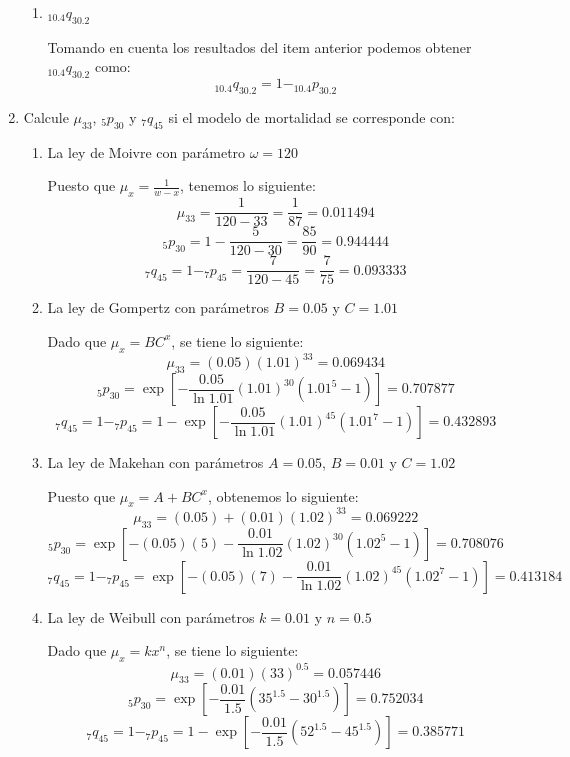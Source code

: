 \documentclass[12pt,a4paper,oneside]{article}\usepackage[]{graphicx}\usepackage[]{color}
\begin{document}
\begin{enumerate}
\begin{enumerate}
      \item $_{10.4}q_{30.2}$
      
      Tomando en cuenta los resultados del item anterior podemos obtener $_{10.4}q_{30.2}$ como:
      \[ _{10.4}q_{30.2}= 1- _{10.4}p_{30.2}\]
\end{enumerate}

\item Calcule $\mu_{33}$, $_{5}p_{30}$ y $_{7}q_{45}$ si el modelo de mortalidad se corresponde con:
\begin{enumerate}
      \item La ley de Moivre con parámetro $\omega=120$
      
      Puesto que $\mu_x=\frac{1}{w-x}$, tenemos lo siguiente:
      \[\mu_{33}=\frac{1}{120-33}=\frac{1}{87}=0.011494\]
      \[_{5}p_{30}=1-\frac{5}{120-30}=\frac{85}{90}=0.944444\]
      \[_{7}q_{45}=1-_{7}p_{45}=\frac{7}{120-45}=\frac{7}{75}=0.093333\]
      
      \item La ley de Gompertz con parámetros $B=0.05$ y $C=1.01$
      
      Dado que $\mu_x=BC^x$, se tiene lo siguiente:
      \[\mu_{33}=(0.05)(1.01)^{33}=0.069434\]
      \[_{5}p_{30}=\exp\left[-\frac{0.05}{\ln 1.01}(1.01)^{30}(1.01^5-1)\right]=0.707877\]
      \[_{7}q_{45}=1-_{7}p_{45}=1-\exp\left[-\frac{0.05}{\ln 1.01}(1.01)^{45}(1.01^7-1)\right]=0.432893\]
      
      \item La ley de Makehan con parámetros $A = 0.05$, $B = 0.01$ y $C = 1.02$
      
      Puesto que $\mu_x = A + BC^x$, obtenemos lo siguiente:
      \[\mu_{33}=(0.05)+(0.01)(1.02)^{33}=0.069222\]
      \[_{5}p_{30}=\exp\left[-(0.05)(5)-\frac{0.01}{\ln 1.02}(1.02)^{30}(1.02^5-1)\right]=0.708076\]
      \[_{7}q_{45}= 1-_{7}p_{45}=\exp\left[-(0.05)(7)-\frac{0.01}{\ln 1.02}(1.02)^{45}(1.02^7-1)\right]=0.413184\]
      
      \item La ley de Weibull con parámetros $k=0.01$ y $n=0.5$
      
      Dado que $\mu_x = kx^n$, se tiene lo siguiente:
      \[\mu_{33} = (0.01)(33)^{0.5}=0.057446\]
      \[_{5}p_{30} = \exp\left[-\frac{0.01}{1.5}\left(35^{1.5}-30^{1.5}\right)\right]=0.752034\]
      \[_{7}q_{45} = 1-_{7}p_{45}= 1- \exp\left[-\frac{0.01}{1.5}\left(52^{1.5}-45^{1.5}\right)\right] = 0.385771 \]
\end{enumerate}
\end{enumerate}
\end{document}
